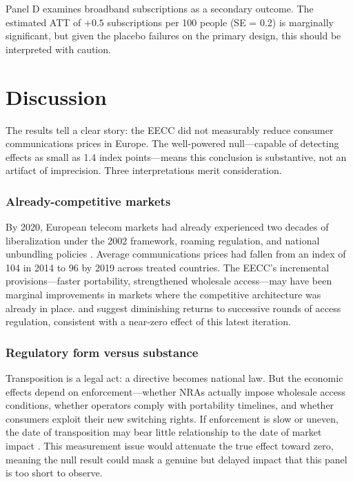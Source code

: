 \documentclass[12pt]{article}
\begin{document}
Panel D examines broadband subscriptions as a secondary outcome. The estimated ATT of $+0.5$ subscriptions per 100 people (SE = 0.2) is marginally significant, but given the placebo failures on the primary design, this should be interpreted with caution.



\section{Discussion}

The results tell a clear story: the EECC did not measurably reduce consumer communications prices in Europe. The well-powered null---capable of detecting effects as small as 1.4 index points---means this conclusion is substantive, not an artifact of imprecision. Three interpretations merit consideration.

\subsubsection*{Already-competitive markets} By 2020, European telecom markets had already experienced two decades of liberalization under the 2002 framework, roaming regulation, and national unbundling policies \citep{cave2019european, genakos2015}. Average communications prices had fallen from an index of 104 in 2014 to 96 by 2019 across treated countries. The EECC's incremental provisions---faster portability, strengthened wholesale access---may have been marginal improvements in markets where the competitive architecture was already in place. \citet{bourreau2014} and \citet{grajek2012} suggest diminishing returns to successive rounds of access regulation, consistent with a near-zero effect of this latest iteration.

\subsubsection*{Regulatory form versus substance} Transposition is a legal act: a directive becomes national law. But the economic effects depend on enforcement---whether NRAs actually impose wholesale access conditions, whether operators comply with portability timelines, and whether consumers exploit their new switching rights. If enforcement is slow or uneven, the date of transposition may bear little relationship to the date of market impact \citep{falkner2005complying}. This measurement issue would attenuate the true effect toward zero, meaning the null result could mask a genuine but delayed impact that this panel is too short to observe.
\end{document}
